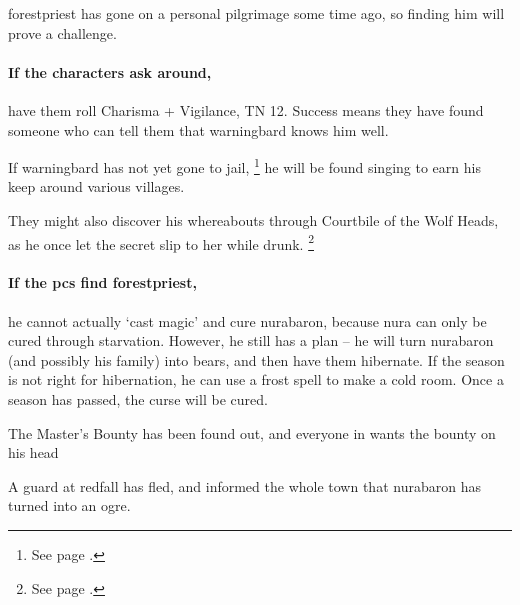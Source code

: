 \Gls{forestpriest} has gone on a personal pilgrimage some time ago, so finding him will prove a challenge.

\paragraph{If the characters ask around,}
have them roll Charisma + Vigilance, TN 12.
Success means they have found someone who can tell them that \gls{warningbard} knows him well.

If \gls{warningbard} has not yet gone to jail,%
\footnote{See page \pageref{warningbard}.}
he will be found singing to earn his keep around various \glspl{village}.

They might also discover his whereabouts through Courtbile of the Wolf Heads, as he once let the secret slip to her while drunk.%
\footnote{See page \pageref{courtbile}.}

\paragraph{If the \glspl{pc} find \gls{forestpriest},}
he cannot actually `cast magic' and cure \gls{nurabaron}, because nura can only be cured through starvation.
However, he still has a plan -- he will turn \gls{nurabaron} (and possibly his family) into bears, and then have them hibernate.
If the season is not right for hibernation, he can use a frost spell to make a cold room.
Once a season has passed, the curse will be cured.


{The Master's Bounty}%
{ has been found out, and everyone in  wants the bounty on his head}%
\label{mastersBounty}

A guard at \gls{redfall} has fled, and informed the whole town that \gls{nurabaron} has turned into an ogre.


